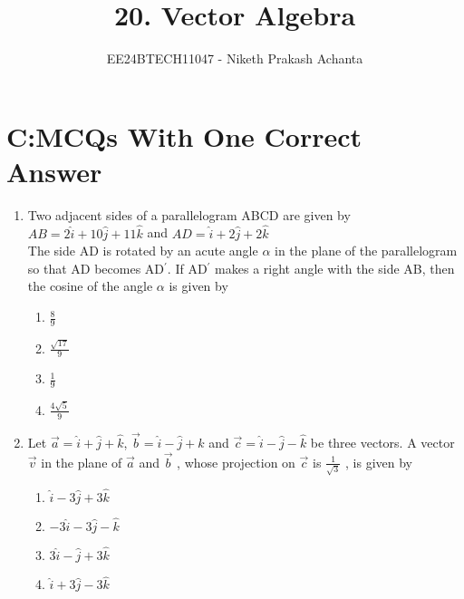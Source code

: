 \documentclass[journal,12pt,twocolumn]{IEEEtran}
\theoremstyle{remark}
\begin{document}

\vspace{3cm}

\title{20. Vector Algebra}
\author{EE24BTECH11047 - Niketh Prakash Achanta}
\maketitle
\newpage
\bigskip
\section{C:MCQs With One Correct Answer}
\renewcommand{\thefigure}{\theenumi}
\renewcommand{\thetable}{\theenumi}
\begin{enumerate}
	\item %
		Two adjacent sides of a parallelogram ABCD are given by $AB = 2\hat{i}+10\hat{j}+11\hat{k}$ and $AD = \hat{i}+2\hat{j}+2\hat{k}$ \\
		The side AD is rotated by an acute angle $\alpha$ in the plane of the parallelogram so that AD becomes AD$^{\prime}$. If AD$^{\prime}$ makes a right angle with the side AB, then the cosine of the angle $\alpha$ is given by \hfill{}\\
\begin{enumerate}
	\item $\frac{8}{9}$
	\item $\frac{\sqrt{17}}{9}$
	\item $\frac{1}{9}$
	\item $\frac{4\sqrt{5}}{9}$\\
\end{enumerate}

        \item %
		Let $\vec{a}=\hat{i}+\hat{j}+\hat{k}$, $\vec{b}=\hat{i}-\hat{j}+\hat{k}$ and $\vec{c}=\hat{i}-\hat{j}-\hat{k}$ be three vectors. A vector $\vec{v}$ in the plane of $\vec{a}$ and $\vec{b}$ , whose projection on $\vec{c}$ is $\frac{1}{\sqrt{3}}$ , is given by \hfill{}\\
\begin{enumerate}
	\item $\hat{i}-3\hat{j}+3\hat{k}$
	\item $-3\hat{i}-3\hat{j}-\hat{k}$
	\item $3\hat{i}-\hat{j}+3\hat{k}$
	\item $\hat{i}+3\hat{j}-3\hat{k}$\\
\end{enumerate}
       

\end{enumerate}
\end{document}
